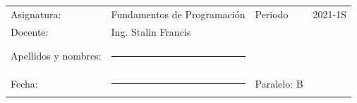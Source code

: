 \documentclass[12pt]{exam}
\begin{document}
\begin{table}[H]
  \centering
  \begin{tabular}[H]{llll}
    Asignatura: & Fundamentos de Programación & Periodo & 2021-1S\\
    Docente: & Ing. Stalin Francis &  & \\
              &                     &            & \\     
    Apellidos y nombres: &\rule{7cm}{0.4pt}    &  & \\
              &                     &            & \\
    Fecha: &\rule{5cm}{0.4pt}   & Paralelo:  B& \\
  \end{tabular}
\end{table}
\end{document}
